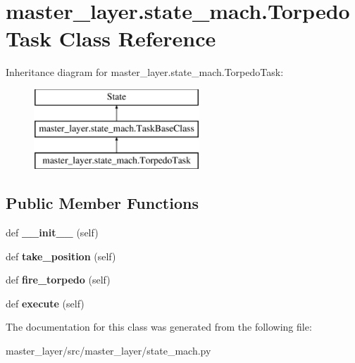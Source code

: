 \hypertarget{classmaster__layer_1_1state__mach_1_1TorpedoTask}{}\section{master\+\_\+layer.\+state\+\_\+mach.\+Torpedo\+Task Class Reference}
\label{classmaster__layer_1_1state__mach_1_1TorpedoTask}
Inheritance diagram for master\+\_\+layer.\+state\+\_\+mach.\+Torpedo\+Task\+:\begin{figure}[H]
\begin{center}
\leavevmode
\includegraphics[height=3.000000cm]{classmaster__layer_1_1state__mach_1_1TorpedoTask}
\end{center}
\end{figure}
\subsection*{Public Member Functions}
\begin{DoxyCompactItemize}
\item 
\mbox{\label{classmaster__layer_1_1state__mach_1_1TorpedoTask_a12b8179261ccd6063de54a1b37cd1386}} 
def {\bfseries \+\_\+\+\_\+init\+\_\+\+\_\+} (self)
\item 
\mbox{\label{classmaster__layer_1_1state__mach_1_1TorpedoTask_af553e1b0d156f57158913d794696b59f}} 
def {\bfseries take\+\_\+position} (self)
\item 
\mbox{\label{classmaster__layer_1_1state__mach_1_1TorpedoTask_a0eab6402ec065ccfc33b99d13f8650a4}} 
def {\bfseries fire\+\_\+torpedo} (self)
\item 
\mbox{\label{classmaster__layer_1_1state__mach_1_1TorpedoTask_a3000c3afea5bf66f5e48611d74a8c9e7}} 
def {\bfseries execute} (self)
\end{DoxyCompactItemize}


The documentation for this class was generated from the following file\+:\begin{DoxyCompactItemize}
\item 
master\+\_\+layer/src/master\+\_\+layer/state\+\_\+mach.\+py\end{DoxyCompactItemize}
